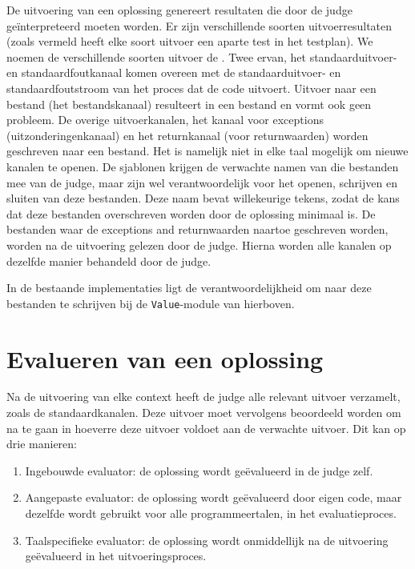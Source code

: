 De uitvoering van een oplossing genereert resultaten die door de judge geïnterpreteerd moeten worden.
Er zijn verschillende soorten uitvoerresultaten (zoals vermeld heeft elke soort uitvoer een aparte test in het testplan).
We noemen de verschillende soorten uitvoer de .
Twee ervan, het standaarduitvoer- en standaardfoutkanaal komen overeen met de standaarduitvoer- en standaardfoutstroom van het proces dat de code uitvoert.
Uitvoer naar een bestand (het bestandskanaal) resulteert in een bestand en vormt ook geen probleem.
De overige uitvoerkanalen, het kanaal voor exceptions (uitzonderingenkanaal) en het returnkanaal (voor returnwaarden) worden geschreven naar een bestand.
Het is namelijk niet in elke taal mogelijk om nieuwe kanalen te openen.
De sjablonen krijgen de verwachte namen van die bestanden mee van de judge, maar zijn wel verantwoordelijk voor het openen, schrijven en sluiten van deze bestanden.
Deze naam bevat willekeurige tekens, zodat de kans dat deze bestanden overschreven worden door de oplossing minimaal is.
De bestanden waar de exceptions and returnwaarden naartoe geschreven worden, worden na de uitvoering gelezen door de judge.
Hierna worden alle kanalen op dezelfde manier behandeld door de judge.

In de bestaande implementaties ligt de verantwoordelijkheid om naar deze bestanden te schrijven bij de \texttt{Value}-module van hierboven.

\section{Evalueren van een oplossing}\label{sec:evalueren-van-een-oplossing2}

Na de uitvoering van elke context heeft de judge alle relevant uitvoer verzamelt, zoals de standaardkanalen.
Deze uitvoer moet vervolgens beoordeeld worden om na te gaan in hoeverre deze uitvoer voldoet aan de verwachte uitvoer.
Dit kan op drie manieren:
\begin{enumerate}
    \item Ingebouwde evaluator: de oplossing wordt geëvalueerd in de judge zelf.
    \item Aangepaste evaluator: de oplossing wordt geëvalueerd door eigen code, maar dezelfde wordt gebruikt voor alle programmeertalen, in het evaluatieproces.
    \item Taalspecifieke evaluator: de oplossing wordt onmiddellijk na de uitvoering geëvalueerd in het uitvoeringsproces.
\end{enumerate}

